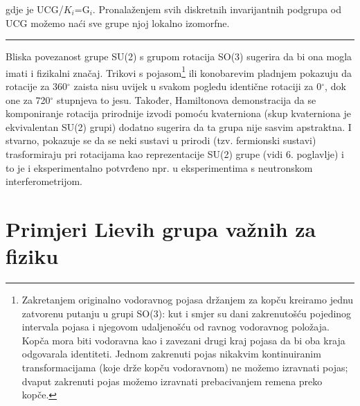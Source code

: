 gdje je UCG/$K_i$=G$_i$. Pronalaženjem svih diskretnih invarijantnih
podgrupa od UCG možemo naći sve grupe njoj lokalno izomorfne.

\rule{3cm}{0.5pt}

   Bliska povezanost grupe SU(2) s grupom rotacija SO(3) sugerira da
bi ona mogla imati i fizikalni značaj. Trikovi s pojasom\footnote{Zakretanjem
originalno vodoravnog pojasa držanjem za kopču kreiramo jednu zatvorenu putanju
u grupi SO(3): kut i smjer su dani zakrenutošću pojedinog intervala
pojasa i njegovom udaljenošću od ravnog vodoravnog položaja. 
Kopča mora biti vodoravna kao i zavezani drugi kraj pojasa da bi
oba kraja odgovarala identiteti. Jednom zakrenuti pojas nikakvim kontinuiranim
transformacijama (koje drže kopču vodoravnom) ne možemo izravnati pojas; dvaput
zakrenuti pojas možemo izravnati prebacivanjem remena preko kopče.}
 ili konobarevim
pladnjem pokazuju da rotacije za 360$^\circ$ zaista nisu uvijek u svakom pogledu
identične rotaciji za 0$^\circ$, dok one za 720$^\circ$ stupnjeva to jesu.
Također, Hamiltonova demonstracija da se komponiranje rotacija prirodnije
izvodi pomoću kvaterniona (skup kvaterniona je ekvivalentan SU(2) grupi) 
dodatno sugerira da ta grupa nije sasvim apstraktna.
  I stvarno, pokazuje se da se neki sustavi u prirodi (tzv. fermionski
sustavi) trasformiraju pri rotacijama kao reprezentacije SU(2) grupe
(vidi 6. poglavlje)
i to je i eksperimentalno potvrđeno npr. u eksperimentima s neutronskom
interferometrijom. 

\section{Primjeri Lievih grupa važnih za fiziku}

